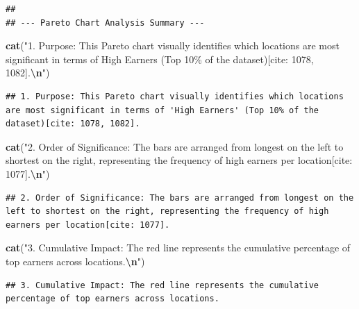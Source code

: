\documentclass[
]{article}
\newenvironment{Shaded}{\begin{snugshade}}{\end{snugshade}}
\newcommand{\FunctionTok}[1]{\textcolor[rgb]{0.13,0.29,0.53}{\textbf{#1}}}
\newcommand{\NormalTok}[1]{#1}
\newcommand{\SpecialCharTok}[1]{\textcolor[rgb]{0.81,0.36,0.00}{\textbf{#1}}}
\newcommand{\StringTok}[1]{\textcolor[rgb]{0.31,0.60,0.02}{#1}}
\begin{document}
\begin{verbatim}
## 
## --- Pareto Chart Analysis Summary ---
\end{verbatim}

\begin{Shaded}
\begin{Highlighting}[]
\FunctionTok{cat}\NormalTok{(}\StringTok{"1. Purpose: This Pareto chart visually identifies which locations are most significant in terms of \textquotesingle{}High Earners\textquotesingle{} (Top 10\% of the dataset)[cite: 1078, 1082].}\SpecialCharTok{\textbackslash{}n}\StringTok{"}\NormalTok{)}
\end{Highlighting}
\end{Shaded}

\begin{verbatim}
## 1. Purpose: This Pareto chart visually identifies which locations are most significant in terms of 'High Earners' (Top 10% of the dataset)[cite: 1078, 1082].
\end{verbatim}

\begin{Shaded}
\begin{Highlighting}[]
\FunctionTok{cat}\NormalTok{(}\StringTok{"2. Order of Significance: The bars are arranged from longest on the left to shortest on the right, representing the frequency of high earners per location[cite: 1077].}\SpecialCharTok{\textbackslash{}n}\StringTok{"}\NormalTok{)}
\end{Highlighting}
\end{Shaded}

\begin{verbatim}
## 2. Order of Significance: The bars are arranged from longest on the left to shortest on the right, representing the frequency of high earners per location[cite: 1077].
\end{verbatim}

\begin{Shaded}
\begin{Highlighting}[]
\FunctionTok{cat}\NormalTok{(}\StringTok{"3. Cumulative Impact: The red line represents the cumulative percentage of top earners across locations.}\SpecialCharTok{\textbackslash{}n}\StringTok{"}\NormalTok{)}
\end{Highlighting}
\end{Shaded}

\begin{verbatim}
## 3. Cumulative Impact: The red line represents the cumulative percentage of top earners across locations.
\end{verbatim}
\end{document}
